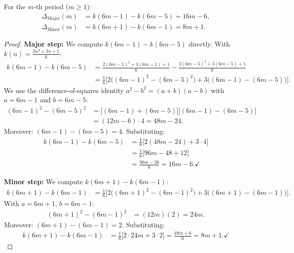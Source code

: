 \begin{theorem}\label{satz:minor_major_formeln}
For the $m$-th period ($m \geq 1$):
\begin{align}
  \Delta_{\mathrm{Major}}(m)
  &= k(6m-1) - k(6m-5)
  = 16m - 6,\label{eq:major_formel}\\[6pt]
  \Delta_{\mathrm{Minor}}(m)
  &= k(6m+1) - k(6m-1)
  = 8m + 1.\label{eq:minor_formel}
\end{align}
\end{theorem}

\begin{proof}
\textbf{Major step:} We compute $k(6m-1) - k(6m-5)$ directly.
With $k(n) = \frac{2n^2+3n+1}{6}$:
\begin{align*}
  k(6m-1) - k(6m-5)
  &= \frac{2(6m-1)^2 + 3(6m-1) + 1}{6}
   - \frac{2(6m-5)^2 + 3(6m-5) + 1}{6} \\[4pt]
  &= \frac{1}{6}\bigl[2\bigl((6m-1)^2 - (6m-5)^2\bigr)
     + 3\bigl((6m-1) - (6m-5)\bigr)\bigr].
\end{align*}
We use the difference-of-squares identity $a^2 - b^2 = (a+b)(a-b)$
with $a = 6m-1$ and $b = 6m-5$:
\begin{align*}
  (6m-1)^2 - (6m-5)^2
  &= \bigl[(6m-1)+(6m-5)\bigr]\bigl[(6m-1)-(6m-5)\bigr] \\
  &= (12m-6)\cdot 4
  = 48m - 24.
\end{align*}
Moreover: $(6m-1)-(6m-5) = 4$. Substituting:
\begin{align*}
  k(6m-1) - k(6m-5)
  &= \frac{1}{6}\bigl[2(48m-24) + 3 \cdot 4\bigr] \\
  &= \frac{1}{6}\bigl[96m - 48 + 12\bigr] \\
  &= \frac{96m - 36}{6}
  = 16m - 6. \checkmark
\end{align*}

\textbf{Minor step:} We compute $k(6m+1) - k(6m-1)$:
\begin{align*}
  k(6m+1) - k(6m-1)
  &= \frac{1}{6}\bigl[2\bigl((6m+1)^2 - (6m-1)^2\bigr)
     + 3\bigl((6m+1) - (6m-1)\bigr)\bigr].
\end{align*}
With $a = 6m+1$, $b = 6m-1$:
\begin{align*}
  (6m+1)^2 - (6m-1)^2
  &= (12m)(2) = 24m.
\end{align*}
Moreover: $(6m+1)-(6m-1) = 2$. Substituting:
\begin{align*}
  k(6m+1) - k(6m-1)
  &= \frac{1}{6}\bigl[2 \cdot 24m + 3 \cdot 2\bigr]
  = \frac{48m + 6}{6}
  = 8m + 1. \checkmark
\end{align*}
\end{proof}

